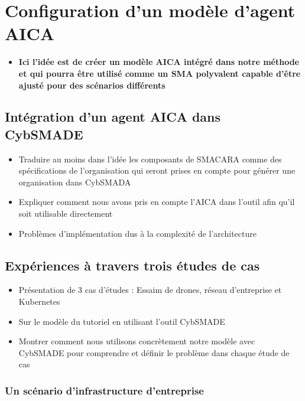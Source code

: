 \chapter{Configuration d'un modèle d'agent AICA}\label{ch:case_studies} %

\begin{itemize}
    \item \textbf{Ici l'idée est de créer un modèle AICA intégré dans notre méthode et qui pourra être utilisé comme un SMA polyvalent capable d'être ajusté pour des scénarios différents}
\end{itemize}


\section{Intégration d'un agent AICA dans CybSMADE}
\begin{itemize}
    \item Traduire au moins dans l'idée les composants de SMACARA comme des spécifications de l'organisation qui seront prises en compte pour générer une organisation dans CybSMADA
    \item Expliquer comment nous avons pris en compte l'AICA dans l'outil afin qu'il soit utilisable directement
    \item Problèmes d'implémentation dus à la complexité de l'architecture
\end{itemize}


\section{Expériences à travers trois études de cas}
\begin{itemize}
    \item Présentation de 3 cas d'études : Essaim de drones, réseau d'entreprise et Kubernetes
    \item Sur le modèle du tutoriel en utilisant l'outil CybSMADE
    \item Montrer comment nous utilisons concrètement notre modèle avec CybSMADE pour comprendre et définir le problème dans chaque étude de cas
\end{itemize}

\subsection{Un scénario d'infrastructure d'entreprise}

